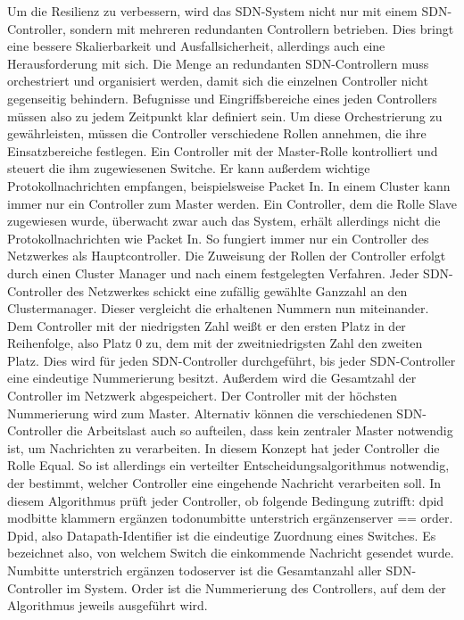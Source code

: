 Um die Resilienz zu verbessern, wird das \ac{SDN}-System nicht nur mit einem \ac{SDN}-Controller, sondern mit mehreren redundanten Controllern betrieben. Dies bringt eine bessere Skalierbarkeit und Ausfallsicherheit, 
allerdings auch eine Herausforderung mit sich. Die Menge an redundanten \ac{SDN}-Controllern muss orchestriert und organisiert werden, damit sich die einzelnen Controller nicht gegenseitig behindern. 
Befugnisse und Eingriffsbereiche eines jeden Controllers müssen also zu jedem Zeitpunkt klar definiert sein. Um diese Orchestrierung zu gewährleisten, müssen die Controller verschiedene Rollen annehmen, 
die ihre Einsatzbereiche festlegen. Ein Controller mit der Master-Rolle kontrolliert und steuert die ihm zugewiesenen Switche. Er kann außerdem wichtige Protokollnachrichten empfangen, beispielsweise Packet In. 
In einem Cluster kann immer nur ein Controller zum Master werden. Ein Controller, dem die Rolle Slave zugewiesen wurde, überwacht zwar auch das System, erhält allerdings nicht die Protokollnachrichten wie Packet In. 
So fungiert immer nur ein Controller des Netzwerkes als Hauptcontroller. Die Zuweisung der Rollen der Controller erfolgt durch einen Cluster Manager und nach einem festgelegten Verfahren. 
Jeder \ac{SDN}-Controller des Netzwerkes schickt eine zufällig gewählte Ganzzahl an den Clustermanager. Dieser vergleicht die erhaltenen Nummern nun miteinander. 
Dem Controller mit der niedrigsten Zahl weißt er den ersten Platz in der Reihenfolge, also Platz 0 zu, dem mit der zweitniedrigsten Zahl den zweiten Platz. Dies wird für jeden \ac{SDN}-Controller durchgeführt, 
bis jeder \ac{SDN}-Controller eine eindeutige Nummerierung besitzt. Außerdem wird die Gesamtzahl der Controller im Netzwerk abgespeichert. Der Controller mit der höchsten Nummerierung wird zum Master. 
Alternativ können die verschiedenen \ac{SDN}-Controller die Arbeitslast auch so aufteilen, dass kein zentraler Master notwendig ist, um Nachrichten zu verarbeiten. In diesem Konzept hat jeder Controller die Rolle Equal. 
So ist allerdings ein verteilter Entscheidungsalgorithmus notwendig, der bestimmt, welcher Controller eine eingehende Nachricht verarbeiten soll. In diesem Algorithmus prüft jeder Controller, ob folgende Bedingung zutrifft: 
dpid modbitte klammern ergänzen todonumbitte unterstrich ergänzenserver == order. Dpid, also Datapath-Identifier ist die eindeutige Zuordnung eines Switches. Es bezeichnet also, von welchem Switch die einkommende Nachricht gesendet wurde. 
Numbitte unterstrich ergänzen todoserver ist die Gesamtanzahl aller \ac{SDN}-Controller im System. Order ist die Nummerierung des Controllers, auf dem der Algorithmus jeweils ausgeführt wird. 
